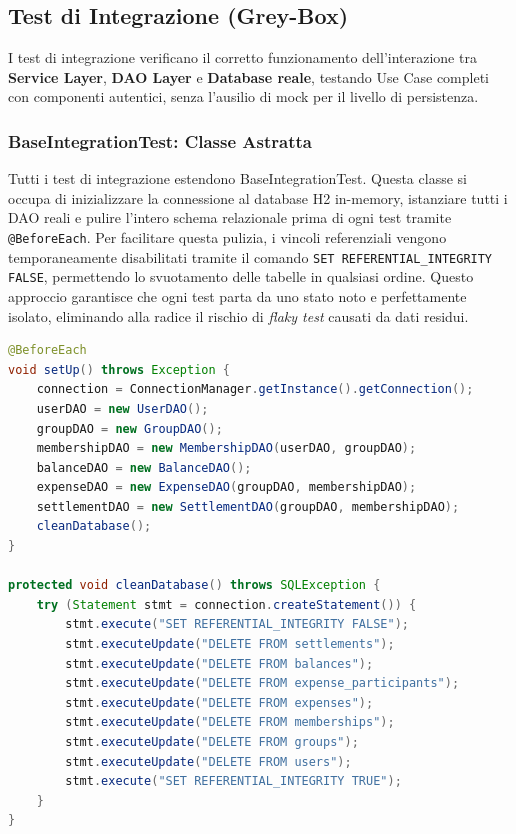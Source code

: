 \subsection{Test di Integrazione (Grey-Box)}

I test di integrazione verificano il corretto funzionamento dell'interazione tra 
\textbf{Service Layer}, \textbf{DAO Layer} e \textbf{Database reale}, 
testando Use Case completi con componenti autentici, senza l'ausilio di mock 
per il livello di persistenza.
\subsubsection{BaseIntegrationTest: Classe Astratta}

Tutti i test di integrazione estendono BaseIntegrationTest. Questa classe
si occupa di inizializzare la connessione al database H2 in-memory, istanziare
tutti i DAO reali e pulire l’intero schema relazionale prima di ogni test tramite
\texttt{@BeforeEach}. Per facilitare questa pulizia, i vincoli referenziali vengono 
temporaneamente disabilitati tramite il comando \texttt{SET REFERENTIAL\_INTEGRITY FALSE}, 
permettendo lo svuotamento delle tabelle in qualsiasi ordine. Questo approccio 
garantisce che ogni test parta da uno stato noto e perfettamente isolato, eliminando 
alla radice il rischio di \textit{flaky test} causati da dati residui.

\begin{lstlisting}[language=Java, caption={Setup e pulizia del database in BaseIntegrationTest}]
@BeforeEach
void setUp() throws Exception {
    connection = ConnectionManager.getInstance().getConnection();
    userDAO = new UserDAO();
    groupDAO = new GroupDAO();
    membershipDAO = new MembershipDAO(userDAO, groupDAO);
    balanceDAO = new BalanceDAO();
    expenseDAO = new ExpenseDAO(groupDAO, membershipDAO);
    settlementDAO = new SettlementDAO(groupDAO, membershipDAO);
    cleanDatabase();
}

protected void cleanDatabase() throws SQLException {
    try (Statement stmt = connection.createStatement()) {
        stmt.execute("SET REFERENTIAL_INTEGRITY FALSE");
        stmt.executeUpdate("DELETE FROM settlements");
        stmt.executeUpdate("DELETE FROM balances");
        stmt.executeUpdate("DELETE FROM expense_participants");
        stmt.executeUpdate("DELETE FROM expenses");
        stmt.executeUpdate("DELETE FROM memberships");
        stmt.executeUpdate("DELETE FROM groups");
        stmt.executeUpdate("DELETE FROM users");
        stmt.execute("SET REFERENTIAL_INTEGRITY TRUE");
    }
}
\end{lstlisting}

